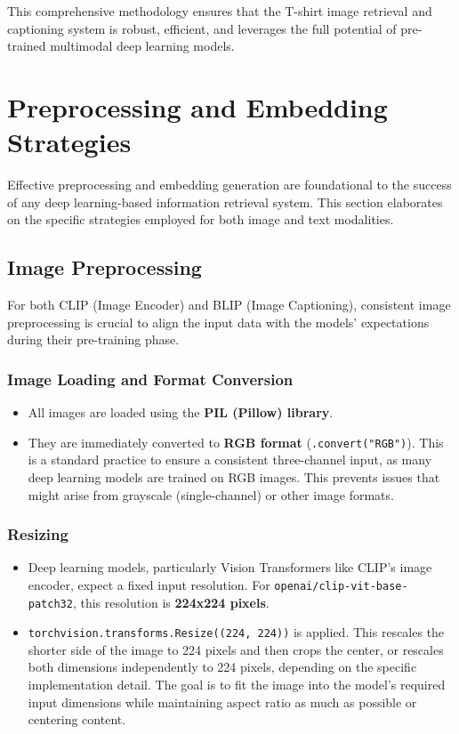 \documentclass{article}
\begin{document}
This comprehensive methodology ensures that the T-shirt image retrieval and captioning system is robust, efficient, and leverages the full potential of pre-trained multimodal deep learning models.

\section{Preprocessing and Embedding Strategies}
\label{sec:preprocessing}


Effective preprocessing and embedding generation are foundational to the success of any deep learning-based information retrieval system. This section elaborates on the specific strategies employed for both image and text modalities.

\subsection{Image Preprocessing}
For both CLIP (Image Encoder) and BLIP (Image Captioning), consistent image preprocessing is crucial to align the input data with the models' expectations during their pre-training phase.

\subsubsection{Image Loading and Format Conversion}
\begin{itemize}
    \item All images are loaded using the \textbf{PIL (Pillow) library}.
    \item They are immediately converted to \textbf{RGB format} (\texttt{.convert("RGB")}). This is a standard practice to ensure a consistent three-channel input, as many deep learning models are trained on RGB images. This prevents issues that might arise from grayscale (single-channel) or other image formats.
\end{itemize}

\subsubsection{Resizing}
\begin{itemize}
    \item Deep learning models, particularly Vision Transformers like CLIP's image encoder, expect a fixed input resolution. For \texttt{openai/clip-vit-base-patch32}, this resolution is \textbf{224x224 pixels}.
    \item \texttt{torchvision.transforms.Resize((224, 224))} is applied. This rescales the shorter side of the image to 224 pixels and then crops the center, or rescales both dimensions independently to 224 pixels, depending on the specific implementation detail. The goal is to fit the image into the model's required input dimensions while maintaining aspect ratio as much as possible or centering content.
\end{itemize}
\end{document}
